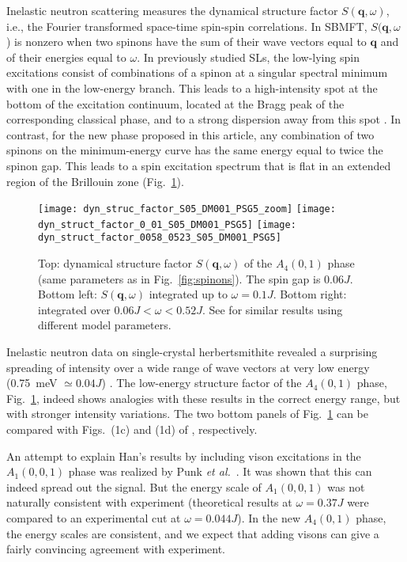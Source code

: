 \documentclass[aps,prl,twocolumn,superscriptaddress,showpacs,a4paper, longbibliography]{revtex4-1}
\begin{document}
Inelastic neutron scattering measures the dynamical structure factor $S(\mathbf q, \omega)$, i.e., the Fourier transformed space-time spin-spin correlations.
In SBMFT, $S(\mathbf q,\omega$) is nonzero when two spinons have the sum of their wave vectors equal to $\mathbf q$ and of their energies equal to $\omega$.
In previously studied SLs, the low-lying spin excitations consist of combinations of a spinon at a singular spectral minimum with one in the low-energy branch.
This leads to a high-intensity spot at the bottom of the excitation continuum, located at the Bragg peak of the corresponding classical phase, and to a strong dispersion away from this spot \cite{HalimehPunk16_PRB.94.104413}.
In contrast, for the new phase proposed in this article, any combination of two spinons on the minimum-energy curve has the same energy equal to twice the spinon gap.
This leads to a spin excitation spectrum that is flat in an extended region of the Brillouin zone (Fig.~\ref{fig:dyn_struct_fact}).

\begin{figure}
 \texttt{[image: dyn\_struc\_factor\_S05\_DM001\_PSG5\_zoom]}
 \texttt{[image: dyn\_struct\_factor\_0\_01\_S05\_DM001\_PSG5]}
 \texttt{[image: dyn\_struct\_factor\_0058\_0523\_S05\_DM001\_PSG5]}
 \caption{Top: dynamical structure factor $S(\mathbf q, \omega)$ of the $A_4(0,1)$ phase 
 (same parameters as in Fig.~\ref{fig:spinons}).
 The spin gap is $0.06 J$.
 Bottom left: $S(\mathbf q, \omega)$ integrated up to $\omega = 0.1J$.
 Bottom right: integrated over $0.06J<\omega<0.52J$.
 See \cite{suppMat} for similar results using different model parameters.
 }
\label{fig:dyn_struct_fact}
\end{figure}

Inelastic neutron data on single-crystal herbertsmithite revealed a surprising spreading of intensity over a wide range of wave vectors at very low energy (0.75~meV $\simeq 0.04J$) \cite{Nature_DM}.
The low-energy structure factor of the $A_4(0,1)$ phase, Fig.~\ref{fig:dyn_struct_fact}, indeed shows analogies with these results in the correct energy range, but with stronger intensity variations.
The two bottom panels of Fig.~\ref{fig:dyn_struct_fact} can be compared with Figs.~(1c) and (1d) of \cite{Nature_DM}, respectively.

An attempt to explain Han's results by including vison excitations in the $A_1(0,0,1)$ phase was realized by Punk {\it et al.}~\cite{SBMFT_Nature}.
It was shown that this can indeed spread out the signal.
But the energy scale of $A_1(0,0,1)$ was not naturally consistent with experiment (theoretical results at $\omega=0.37J$ were compared to an experimental cut at $\omega=0.044J$).
In the new $A_4(0,1)$ phase, the energy scales are consistent, and we expect that adding visons can give a fairly convincing agreement with experiment.
\end{document}
